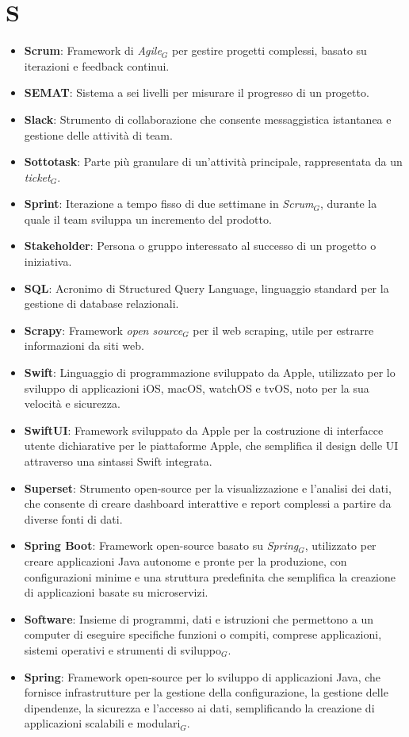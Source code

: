 \section{S}
\begin{itemize}
    \item \textbf{Scrum}: Framework di \textit{Agile}$_G$ per gestire progetti complessi, basato su iterazioni e feedback continui.
    \item \textbf{SEMAT}: Sistema a sei livelli per misurare il progresso di un progetto.
    \item \textbf{Slack}: Strumento di collaborazione che consente messaggistica istantanea e gestione delle attività di team.
    \item \textbf{Sottotask}: Parte più granulare di un’attività principale, rappresentata da un \textit{ticket}$_G$.
    \item \textbf{Sprint}: Iterazione a tempo fisso di due settimane in \textit{Scrum}$_G$, durante la quale il team sviluppa un incremento del prodotto.
    \item \textbf{Stakeholder}: Persona o gruppo interessato al successo di un progetto o iniziativa.
    \item \textbf{SQL}: Acronimo di Structured Query Language, linguaggio standard per la gestione di database relazionali.
    \item \textbf{Scrapy}: Framework \textit{open source}$_G$ per il web scraping, utile per estrarre informazioni da siti web.
    \item \textbf{Swift}: Linguaggio di programmazione sviluppato da Apple, utilizzato per lo sviluppo di applicazioni iOS, macOS, watchOS e tvOS, noto per la sua velocità e sicurezza.
\item \textbf{SwiftUI}: Framework sviluppato da Apple per la costruzione di interfacce utente dichiarative per le piattaforme Apple, che semplifica il design delle UI attraverso una sintassi Swift integrata.
\item \textbf{Superset}: Strumento open-source per la visualizzazione e l'analisi dei dati, che consente di creare dashboard interattive e report complessi a partire da diverse fonti di dati.
\item \textbf{Spring Boot}: Framework open-source basato su \textit{Spring}$_G$, utilizzato per creare applicazioni Java autonome e pronte per la produzione, con configurazioni minime e una struttura predefinita che semplifica la creazione di applicazioni basate su microservizi.
\item \textbf{Software}: Insieme di programmi, dati e istruzioni che permettono a un computer di eseguire specifiche funzioni o compiti, comprese applicazioni, sistemi operativi e strumenti di sviluppo$_G$.
\item \textbf{Spring}: Framework open-source per lo sviluppo di applicazioni Java, che fornisce infrastrutture per la gestione della configurazione, la gestione delle dipendenze, la sicurezza e l'accesso ai dati, semplificando la creazione di applicazioni scalabili e modulari$_G$.

\end{itemize}
